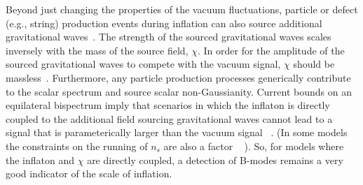 Beyond just changing the properties of the vacuum fluctuations, particle or defect (e.g., string) production events during inflation can also source additional gravitational waves~\cite{Cook:2011hg,Senatore:2011sp}. The strength of the sourced gravitational waves scales inversely with the mass of the source field, $\chi$. In order for the amplitude of the sourced gravitational waves to compete with the vacuum signal, $\chi$ should be massless~\cite{Barnaby:2012xt}. Furthermore, any particle production processes generically contribute to the scalar spectrum and source scalar non-Gaussianity. Current bounds on an equilateral bispectrum imply that scenarios in which the inflaton is directly coupled to the additional field sourcing gravitational waves cannot lead to a signal that is parameterically larger than the vacuum signal ~\cite{Barnaby:2012xt,Ferreira:2014zia,Mirbabayi:2014jqa,Ozsoy:2014sba}. (In some models the constraints on the running of $n_s$ are also a factor ~\cite{Meerburg:2012id} ). So, for models where the inflaton and $\chi$ are directly coupled, a detection of B-modes remains a very good indicator of the scale of inflation. 




